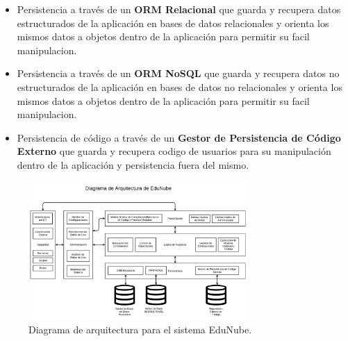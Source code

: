 \begin{itemize}
    \begin{itemize}
    	\item Persistencia a través de un \textbf{ORM Relacional} que guarda y recupera datos estructurados de la aplicación en bases de datos relacionales y orienta los mismos datos a objetos dentro de la aplicación para permitir su facil manipulacion.
        \item Persistencia a través de un \textbf{ORM NoSQL} que guarda y recupera datos no estructurados de la aplicación en bases de datos no relacionales y orienta los mismos datos a objetos dentro de la aplicación para permitir su facil manipulacion.
        \item Persistencia de código a través de un \textbf{Gestor de Persistencia de Código Externo} que guarda y recupera codigo de usuarios para su manipulación dentro de la aplicación y persistencia fuera del mismo.
    \end{itemize}
\end{itemize}

\begin{figure}
  \begin{center}
    \includegraphics[width=0.75\textwidth]{Figures/arq_en.png}
  \end{center}
  \caption{Diagrama de arquitectura para el sistema EduNube.}
  \label{arq_en}
\end{figure}

